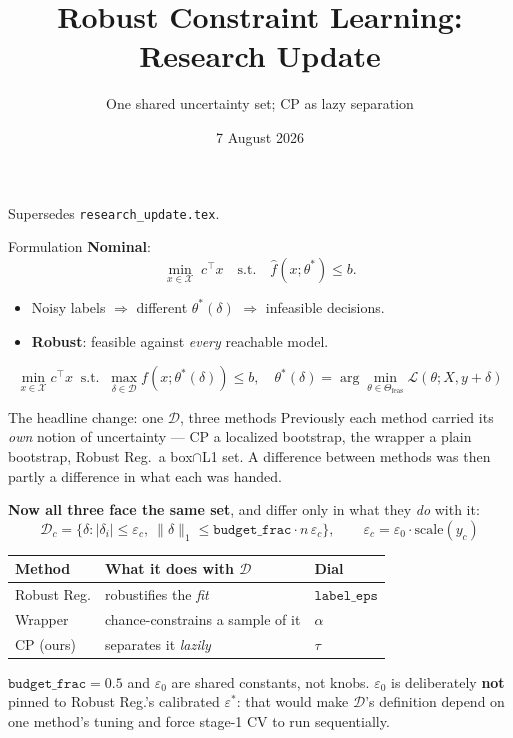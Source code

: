 \documentclass{beamer}
\title{Robust Constraint Learning: Research Update}
\subtitle{One shared uncertainty set; CP as lazy separation}
\date{7 August 2026}
\begin{document}
\begin{frame}
  \titlepage
  \begin{center}\footnotesize
  Supersedes \texttt{research\_update.tex}.
  \end{center}
\end{frame}

\begin{frame}{Formulation}
  \textbf{Nominal}:
  \[
    \min_{x\in\mathcal{X}}\; c^\top x \quad\text{s.t.}\quad \hat f(x;\theta^\ast)\le b .
  \]
  \begin{itemize}
    \item Noisy labels $\Rightarrow$ different $\theta^\ast(\delta)$ $\Rightarrow$ infeasible
      decisions.
    \item \textbf{Robust}: feasible against \emph{every} reachable model.
  \end{itemize}
  \[
    \min_{x\in\mathcal{X}} c^\top x
    \;\;\text{s.t.}\;\; \max_{\delta\in\mathcal{D}} f(x;\theta^\ast(\delta))\le b,
    \quad \theta^\ast(\delta)=\arg\min_{\theta\in\Theta_{\text{feas}}}\mathcal L(\theta;X,y+\delta)
  \]
\end{frame}

\begin{frame}{The headline change: one $\mathcal{D}$, three methods}
  \small
  Previously each method carried its \emph{own} notion of uncertainty --- CP a
  localized bootstrap, the wrapper a plain bootstrap, Robust Reg.\ a box$\cap$L1
  set. A difference between methods was then partly a difference in what each was
  handed.
  \medskip

  \textbf{Now all three face the same set}, and differ only in what they \emph{do}
  with it:
  \[
    \mathcal D_c = \{\delta: |\delta_i|\le\varepsilon_c,\ \lVert\delta\rVert_1 \le
      \texttt{budget\_frac}\cdot n\,\varepsilon_c\},
    \qquad \varepsilon_c = \varepsilon_0\cdot\mathrm{scale}(y_c)
  \]
  \begin{center}\small
  \begin{tabular}{@{}lll@{}}
    \toprule
    Method & What it does with $\mathcal D$ & Dial \\
    \midrule
    Robust Reg. & robustifies the \emph{fit}       & $\texttt{label\_eps}$ \\
    Wrapper     & chance-constrains a sample of it & $\alpha$ \\
    CP (ours)   & separates it \emph{lazily}       & $\tau$ \\
    \bottomrule
  \end{tabular}
  \end{center}
  \medskip
  \footnotesize
  $\texttt{budget\_frac}=0.5$ and $\varepsilon_0$ are shared constants, not knobs.
  $\varepsilon_0$ is deliberately \textbf{not} pinned to Robust Reg.'s calibrated
  $\varepsilon^\ast$: that would make $\mathcal D$'s definition depend on one
  method's tuning and force stage-1 CV to run sequentially.
\end{frame}
\end{document}
